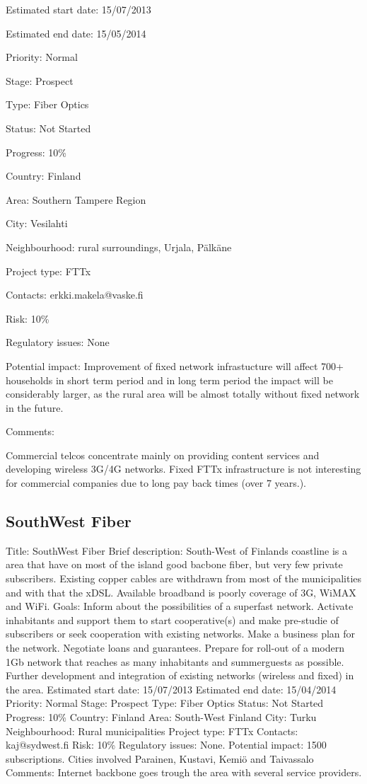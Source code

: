 \documentclass[draftclsnofoot,12pt,journal,onecolumn]{IEEEtran}
\begin{document}
Estimated start date: 15/07/2013 

Estimated end date: 15/05/2014 

Priority: Normal 

Stage: Prospect 

Type: Fiber Optics 

Status: Not Started 

Progress: 10\% 

Country: Finland 

Area: Southern Tampere Region 

City: Vesilahti 

Neighbourhood: rural surroundings, Urjala, Pälkäne 

Project type: FTTx 

Contacts: erkki.makela@vaske.fi

Risk: 10\% 

Regulatory issues: None 

Potential impact: Improvement of fixed network infrastucture will affect 700+ 
households in short term period and in long term period the impact will be 
considerably larger, as the rural area will be almost totally without fixed 
network in the future. 

Comments: 

Commercial telcos concentrate mainly on providing content services and 
developing wireless 3G/4G networks. 
Fixed FTTx infrastructure is not interesting for commercial companies due to 
long pay back times (over 7 years.). 

\subsection{SouthWest Fiber} 
Title: SouthWest Fiber 
Brief description: 
South-West of Finlands coastline is a area that have on most of the island 
good bacbone fiber, but very few private subscribers. Existing copper cables 
are withdrawn from most of the municipalities and with that the xDSL. 
Available broadband is poorly coverage of 3G, WiMAX and WiFi. 
Goals: Inform about the possibilities of a superfast network. Activate 
inhabitants and support them to start cooperative(s) and make pre-studie of 
subscribers or seek cooperation with existing networks. Make a business plan 
for the network. Negotiate loans and guarantees. Prepare for roll-out of a 
modern 1Gb network that reaches as many inhabitants and summerguests as 
possible. Further development and integration of existing networks (wireless 
and fixed) in the area. 
Estimated start date: 15/07/2013 
Estimated end date: 15/04/2014 
Priority: Normal 
Stage: Prospect 
Type: Fiber Optics 
Status: Not Started 
Progress: 10\% 
Country: Finland 
Area: South-West Finland 
City: Turku 
Neighbourhood: Rural municipalities 
Project type: FTTx 
Contacts: kaj@sydwest.fi
Risk: 10\% 
Regulatory issues: None. 
Potential impact: 1500 subscriptions. Cities involved Parainen, Kustavi, 
Kemiö and Taivassalo 
Comments: Internet backbone goes trough the area with several service 
providers. 
\end{document}
